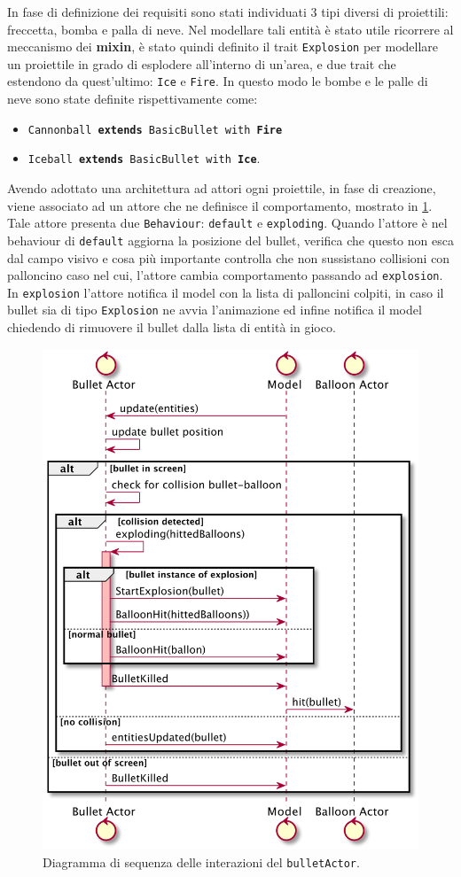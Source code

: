 In fase di definizione dei requisiti sono stati individuati 3 tipi diversi di proiettili: freccetta, bomba e palla di neve.
Nel modellare tali entità è stato utile ricorrere al meccanismo dei \textbf{mixin}, è stato quindi definito il trait \texttt{Explosion}
per modellare un proiettile in grado di esplodere all'interno di un'area, e due trait che estendono da quest'ultimo:
\texttt{Ice} e \texttt{Fire}.
In questo modo le bombe e le palle di neve sono state definite rispettivamente come:
\begin{itemize}
    \item \texttt{Cannonball \textbf{extends} BasicBullet with \textbf{Fire}}
    \item \texttt{Iceball \textbf{extends} BasicBullet with \textbf{Ice}}.
\end{itemize}

Avendo adottato una architettura ad attori ogni proiettile, in fase di creazione, viene associato ad un attore che ne definisce
il comportamento, mostrato in \ref{fig:sequence-bullet-actor}. Tale attore presenta due \texttt{Behaviour}: \texttt{default} e \texttt{exploding}.
Quando l'attore è nel behaviour di \texttt{default} aggiorna la posizione del bullet, verifica che questo non esca dal campo visivo e
cosa più importante controlla che non sussistano collisioni con palloncino caso nel cui, l'attore cambia comportamento
passando ad \texttt{explosion}.
In \texttt{explosion} l'attore notifica il model con la lista di palloncini colpiti, in caso il bullet sia di tipo
\texttt{Explosion} ne avvia l'animazione ed infine notifica il model chiedendo di rimuovere il bullet dalla lista di entità
in gioco.


\begin{figure}[H]
    \centering
    \includegraphics[width=.7\linewidth]{img/sequence-bullet-actor}
    \caption{Diagramma di sequenza delle interazioni del \texttt{bulletActor}.}
    \label{fig:sequence-bullet-actor}
\end{figure}

